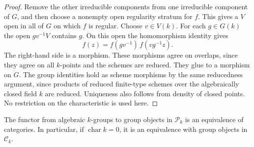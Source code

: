 \begin{proof}
Remove the other irreducible components from one irreducible component
of $G$, and then choose a nonempty open regularity stratum for $f$.
This gives a $V$ open in all of $G$ on which $f$ is regular.
Choose $v\in V(k)$.  For each $g\in G(k)$ the open
$g v^{-1}V$ contains $g$.  On this open the homomorphism identity gives
\[
 f(z)=f(gv^{-1})\,f(vg^{-1}z).
\]
The right-hand side is a morphism.  These morphisms agree on overlaps,
since they agree on all $k$-points and the schemes are reduced.  They glue
to a morphism on $G$.  The group identities hold as scheme morphisms by
the same reducedness argument, since products of reduced finite-type
schemes over the algebraically closed field $k$ are reduced.
Uniqueness also follows from density of
closed points.  No restriction on the characteristic is used here.
\end{proof}

\begin{theorem}\label{C:piecewise-group-algebraization}
The functor from algebraic $k$-groups to group objects in $\mathcal P_k$ is
an equivalence of categories.  In particular, if $\operatorname{char}k=0$,
it is an equivalence with group objects in $\mathcal C_k$.
\end{theorem}

